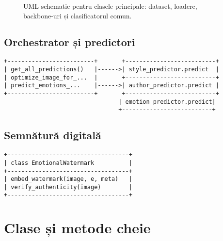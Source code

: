 \begin{figure}[!htbp]
  \centering
  \caption{UML schematic pentru clasele principale: dataset, loadere, backbone-uri și clasificatorul comun.}
  \label{fig:c5-uml}
\end{figure}

\subsection{Orchestrator și predictori}
\begin{verbatim}
+-------------------------+       +--------------------------+
| get_all_predictions()   |------>| style_predictor.predict  |
| optimize_image_for_...  |       +--------------------------+
| predict_emotions_...    |------>| author_predictor.predict |
+-------------------------+       +--------------------------+
                                 | emotion_predictor.predict|
                                 +--------------------------+
\end{verbatim}

\subsection{Semnătură digitală}
\begin{verbatim}
+-----------------------------------+
| class EmotionalWatermark          |
+-----------------------------------+
| embed_watermark(image, e, meta)   |
| verify_authenticity(image)        |
+-----------------------------------+
\end{verbatim}

\section{Clase și metode cheie}\label{sec:key_classes}


